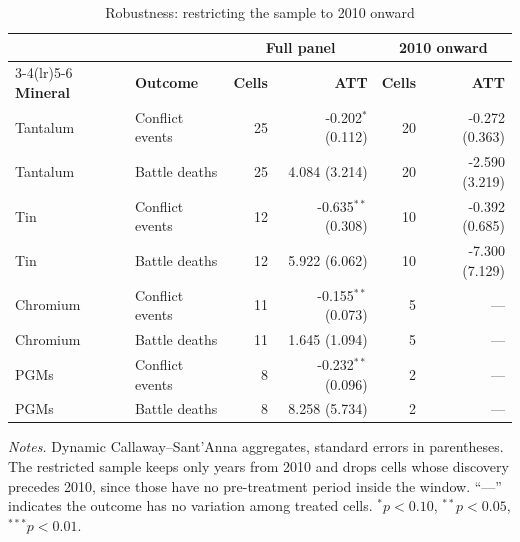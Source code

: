 \begin{table}[H]
\centering
\footnotesize
\caption{Robustness: restricting the sample to 2010 onward}
\label{tab:post2010}
\begin{tabular}{llrrrr}
\toprule
& & \multicolumn{2}{c}{\textbf{Full panel}} & \multicolumn{2}{c}{\textbf{2010 onward}} \\
\cmidrule(lr){3-4}\cmidrule(lr){5-6}
\textbf{Mineral} & \textbf{Outcome} & \textbf{Cells} & \textbf{ATT} & \textbf{Cells} & \textbf{ATT} \\
\midrule
Tantalum & Conflict events & 25 & -0.202$^{*}$ (0.112) & 20 & -0.272 (0.363) \\
Tantalum & Battle deaths & 25 & 4.084 (3.214) & 20 & -2.590 (3.219) \\
Tin & Conflict events & 12 & -0.635$^{**}$ (0.308) & 10 & -0.392 (0.685) \\
Tin & Battle deaths & 12 & 5.922 (6.062) & 10 & -7.300 (7.129) \\
Chromium & Conflict events & 11 & -0.155$^{**}$ (0.073) & 5 & --- \\
Chromium & Battle deaths & 11 & 1.645 (1.094) & 5 & --- \\
PGMs & Conflict events & 8 & -0.232$^{**}$ (0.096) & 2 & --- \\
PGMs & Battle deaths & 8 & 8.258 (5.734) & 2 & --- \\
\bottomrule
\end{tabular}
\begin{minipage}{0.92\textwidth}\vspace{4pt}\scriptsize \textit{Notes.} Dynamic Callaway--Sant'Anna aggregates, standard errors in parentheses. The restricted sample keeps only years from 2010 and drops cells whose discovery precedes 2010, since those have no pre-treatment period inside the window. ``---'' indicates the outcome has no variation among treated cells. $^{*}p<0.10$, $^{**}p<0.05$, $^{***}p<0.01$.\end{minipage}
\end{table}
